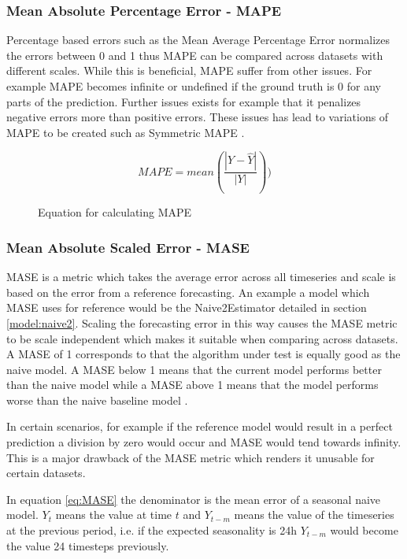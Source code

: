 \subsubsection{Mean Absolute Percentage Error - MAPE}
Percentage based errors such as the Mean Average Percentage Error normalizes the errors between 0 and 1 thus MAPE can be compared across datasets with different scales. While this is beneficial, MAPE suffer from other issues. For example MAPE becomes infinite or undefined if the ground truth is 0 for any parts of the prediction. Further issues exists for example that it penalizes negative errors more than positive errors. These issues has lead to variations of MAPE to be created such as Symmetric MAPE \cite{hyndman_forecasting_3rd,gluonts-github}.

\begin{figure}[h]
  \[MAPE = mean(\frac{|Y - \hat{Y}|}{|Y|}))\]
  \caption{Equation for calculating MAPE}
  \label{eq:MAPE}
\end{figure}

\subsubsection{Mean Absolute Scaled Error - MASE}
MASE is a metric which takes the average error across all timeseries and scale is based on the error from a reference forecasting. An example a model which MASE uses for reference would be the Naive2Estimator detailed in section \ref{model:naive2}. Scaling the forecasting error in this way causes the MASE metric to be scale independent which makes it suitable when comparing across datasets. A MASE of 1 corresponds to that the algorithm under test is equally good as the naive model. A MASE below 1 means that the current model performs better than the naive model while a MASE above 1 means that the model performs worse than the naive baseline model \cite{hyndman_forecasting_3rd,gluonts-github}.

In certain scenarios, for example if the reference model would result in a perfect prediction a division by zero would occur and MASE would tend towards infinity. This is a major drawback of the MASE metric which renders it unusable for certain datasets.

In equation \ref{eq:MASE} the denominator is the mean error of a seasonal naive model. \(Y_t\) means the value at time \(t\) and \(Y_{t-m}\) means the value of the timeseries at the previous period, i.e. if the expected seasonality is 24h \(Y_{t-m}\) would become the value 24 timesteps previously.

